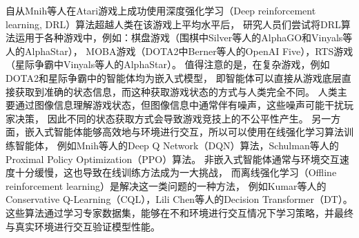 \documentclass[openany,twoside,nofonts,AutoFakeBold,UTF8]{ctexbook}
\begin{document}
自从Mnih等人\cite{DQN}在Atari游戏上成功使用深度强化学习（Deep reinforcement learning, DRL）算法超越人类在该游戏上平均水平后，
研究人员们尝试将DRL算法运用于各种游戏中，例如：棋盘游戏（围棋中Silver等人\cite{AlphaGo}的AlphaGO和Vinyals等人\cite{AlphaStar}的AlphaStar），
MOBA游戏（DOTA2中Berner等人\cite{OpenAIFive}的OpenAI Five），RTS游戏（星际争霸中Vinyals等人\cite{AlphaStar}的AlphaStar）。
值得注意的是，在复杂游戏，例如DOTA2和星际争霸中的智能体均为嵌入式模型，
即智能体可以直接从游戏底层直接获取到准确的状态信息，而这种获取游戏状态的方式与人类完全不同。
人类主要通过图像信息理解游戏状态，但图像信息中通常伴有噪声，这些噪声可能干扰玩家决策，
因此不同的状态获取方式会导致游戏竞技上的不公平性产生。
另一方面，嵌入式智能体能够高效地与环境进行交互，所以可以使用在线强化学习算法训练智能体，
例如Mnih等人\cite{DQN}的Deep Q Network（DQN）算法，Schulman等人\cite{PPO}的Proximal Policy Optimization（PPO）算法。
非嵌入式智能体通常与环境交互速度十分缓慢，这也导致在线训练方法成为一大挑战，
而离线强化学习（Offline reinforcement learning）是解决这一类问题的一种方法，
例如Kumar等人\cite{CQL}的Conservative Q-Learning（CQL），Lili Chen等人\cite{DT}的Decision Transformer（DT）。
这些算法通过学习专家数据集，能够在不和环境进行交互情况下学习策略，并最终与真实环境进行交互验证模型性能。
\end{document}
